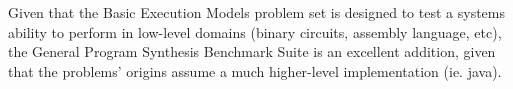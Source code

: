 Given that the Basic Execution Models problem set is designed to test a systems ability to perform in low-level domains (binary circuits, assembly language, etc), the General Program Synthesis Benchmark Suite is an excellent addition, given that the problems' origins assume a much higher-level implementation (ie. java).

